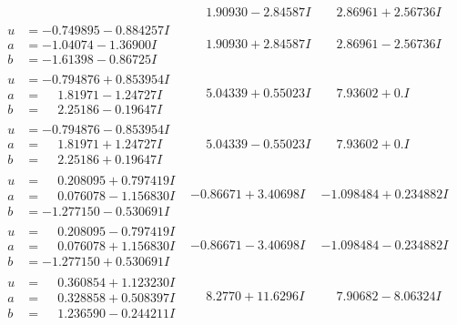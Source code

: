 \documentclass[1p]{elsarticle_modified}
\theoremstyle{definition}
\begin{document}
$$\begin{array}{c|c|c}
 & \phantom{-}1.90930 - 2.84587 I & \phantom{-}2.86961 + 2.56736 I \\ \hline\begin{aligned}
u &= -0.749895 - 0.884257 I \\
a &= -1.04074 - 1.36900 I \\
b &= -1.61398 - 0.86725 I\end{aligned}
 & \phantom{-}1.90930 + 2.84587 I & \phantom{-}2.86961 - 2.56736 I \\ \hline\begin{aligned}
u &= -0.794876 + 0.853954 I \\
a &= \phantom{-}1.81971 - 1.24727 I \\
b &= \phantom{-}2.25186 - 0.19647 I\end{aligned}
 & \phantom{-}5.04339 + 0.55023 I & \phantom{-}7.93602 + 0. I\phantom{ +0.000000I} \\ \hline\begin{aligned}
u &= -0.794876 - 0.853954 I \\
a &= \phantom{-}1.81971 + 1.24727 I \\
b &= \phantom{-}2.25186 + 0.19647 I\end{aligned}
 & \phantom{-}5.04339 - 0.55023 I & \phantom{-}7.93602 + 0. I\phantom{ +0.000000I} \\ \hline\begin{aligned}
u &= \phantom{-}0.208095 + 0.797419 I \\
a &= \phantom{-}0.076078 - 1.156830 I \\
b &= -1.277150 - 0.530691 I\end{aligned}
 & -0.86671 + 3.40698 I & -1.098484 + 0.234882 I \\ \hline\begin{aligned}
u &= \phantom{-}0.208095 - 0.797419 I \\
a &= \phantom{-}0.076078 + 1.156830 I \\
b &= -1.277150 + 0.530691 I\end{aligned}
 & -0.86671 - 3.40698 I & -1.098484 - 0.234882 I \\ \hline\begin{aligned}
u &= \phantom{-}0.360854 + 1.123230 I \\
a &= \phantom{-}0.328858 + 0.508397 I \\
b &= \phantom{-}1.236590 - 0.244211 I\end{aligned}
 & \phantom{-}8.2770 + 11.6296 I & \phantom{-}7.90682 - 8.06324 I \\ \hline\begin{aligned}

\end{aligned}
\end{array}$$
\end{document}
